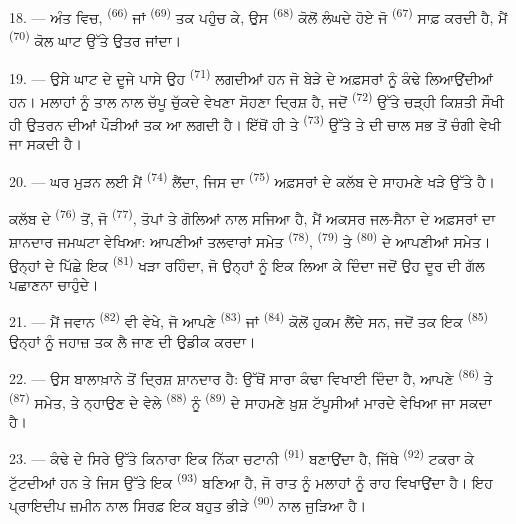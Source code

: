18. --- ਅੰਤ ਵਿਚ,  \textsuperscript{(66)} ਜਾਂ
 \textsuperscript{(69)} ਤਕ ਪਹੁੰਚ ਕੇ, ਉਸ  \textsuperscript{(68)} ਕੋਲੋਂ ਲੰਘਦੇ ਹੋਏ ਜੋ 
\textsuperscript{(67)} ਸਾਫ਼ ਕਰਦੀ ਹੈ, ਮੈਂ 
\textsuperscript{(70)} ਕੋਲ ਘਾਟ ਉੱਤੇ ਉਤਰ ਜਾਂਦਾ।

19. --- ਉਸੇ ਘਾਟ ਦੇ ਦੂਜੇ ਪਾਸੇ ਉਹ  \textsuperscript{(71)}
ਲਗਦੀਆਂ ਹਨ ਜੋ ਬੇੜੇ ਦੇ ਅਫ਼ਸਰਾਂ ਨੂੰ ਕੰਢੇ ਲਿਆਉਂਦੀਆਂ ਹਨ। ਮਲਾਹਾਂ ਨੂੰ ਤਾਲ ਨਾਲ ਚੱਪੂ
ਚੁੱਕਦੇ ਵੇਖਣਾ ਸੋਹਣਾ ਦ੍ਰਿਸ਼ ਹੈ, ਜਦੋਂ  \textsuperscript{(72)} ਉੱਤੇ ਚੜ੍ਹੀ
ਕਿਸ਼ਤੀ ਸੌਖੀ ਹੀ ਉਤਰਨ ਦੀਆਂ ਪੌੜੀਆਂ ਤਕ ਆ ਲਗਦੀ ਹੈ। ਇੱਥੋਂ ਹੀ  ਤੇ
 \textsuperscript{(73)} ਉੱਤੇ  ਤੇ  ਦੀ ਚਾਲ ਸਭ
ਤੋਂ ਚੰਗੀ ਵੇਖੀ ਜਾ ਸਕਦੀ ਹੈ।

\VUsaut{3.0mm}
\VUsaut{3.0mm}

20. --- ਘਰ ਮੁੜਨ ਲਈ ਮੈਂ  \textsuperscript{(74)} ਲੈਂਦਾ, ਜਿਸ ਦਾ
 \textsuperscript{(75)} ਅਫ਼ਸਰਾਂ ਦੇ ਕਲੱਬ ਦੇ ਸਾਹਮਣੇ ਖੜੇ 
ਉੱਤੇ ਹੈ।

ਕਲੱਬ ਦੇ  \textsuperscript{(76)} ਤੋਂ, ਜੋ 
\textsuperscript{(77)}, ਤੋਪਾਂ ਤੇ ਗੋਲਿਆਂ ਨਾਲ ਸਜਿਆ ਹੈ, ਮੈਂ ਅਕਸਰ ਜਲ-ਸੈਨਾ ਦੇ ਅਫ਼ਸਰਾਂ ਦਾ
ਸ਼ਾਨਦਾਰ ਜਮਘਟਾ ਵੇਖਿਆ: ਆਪਣੀਆਂ ਤਲਵਾਰਾਂ ਸਮੇਤ 
\textsuperscript{(78)},  \textsuperscript{(79)} ਤੇ
 \textsuperscript{(80)} ਦੇ  ਆਪਣੀਆਂ 
ਸਮੇਤ। ਉਨ੍ਹਾਂ ਦੇ ਪਿੱਛੇ ਇਕ  \textsuperscript{(81)} ਖੜਾ ਰਹਿੰਦਾ, ਜੋ
ਉਨ੍ਹਾਂ ਨੂੰ ਇਕ  ਲਿਆ ਕੇ ਦਿੰਦਾ ਜਦੋਂ ਉਹ ਦੂਰ ਦੀ ਗੱਲ ਪਛਾਣਨਾ ਚਾਹੁੰਦੇ।

21. --- ਮੈਂ ਜਵਾਨ  \textsuperscript{(82)} ਵੀ ਵੇਖੇ, ਜੋ ਆਪਣੇ
 \textsuperscript{(83)} ਜਾਂ  \textsuperscript{(84)}
ਕੋਲੋਂ ਹੁਕਮ ਲੈਂਦੇ ਸਨ, ਜਦੋਂ ਤਕ ਇਕ  \textsuperscript{(85)}
ਉਨ੍ਹਾਂ ਨੂੰ ਜਹਾਜ਼ ਤਕ ਲੈ ਜਾਣ ਦੀ ਉਡੀਕ ਕਰਦਾ।

22. --- ਉਸ ਬਾਲਾਖ਼ਾਨੇ ਤੋਂ ਦ੍ਰਿਸ਼ ਸ਼ਾਨਦਾਰ ਹੈ: ਉੱਥੋਂ ਸਾਰਾ ਕੰਢਾ ਵਿਖਾਈ ਦਿੰਦਾ ਹੈ, ਆਪਣੇ
 \textsuperscript{(86)} ਤੇ 
\textsuperscript{(87)} ਸਮੇਤ, ਤੇ ਨ੍ਹਾਉਣ ਦੇ ਵੇਲੇ 
\textsuperscript{(88)} ਨੂੰ  \textsuperscript{(89)} ਦੇ ਸਾਹਮਣੇ ਖ਼ੁਸ਼
ਟੱਪੂਸੀਆਂ ਮਾਰਦੇ ਵੇਖਿਆ ਜਾ ਸਕਦਾ ਹੈ।

23. --- ਕੰਢੇ ਦੇ ਸਿਰੇ ਉੱਤੇ ਕਿਨਾਰਾ ਇਕ ਨਿੱਕਾ ਚਟਾਨੀ 
\textsuperscript{(91)} ਬਣਾਉਂਦਾ ਹੈ, ਜਿੱਥੇ  \textsuperscript{(92)}
ਟਕਰਾ ਕੇ ਟੁੱਟਦੀਆਂ ਹਨ ਤੇ ਜਿਸ ਉੱਤੇ ਇਕ 
\textsuperscript{(93)} ਬਣਿਆ ਹੈ, ਜੋ ਰਾਤ ਨੂੰ ਮਲਾਹਾਂ ਨੂੰ ਰਾਹ ਵਿਖਾਉਂਦਾ ਹੈ। ਇਹ ਪ੍ਰਾਇਦੀਪ
ਜ਼ਮੀਨ ਨਾਲ ਸਿਰਫ਼ ਇਕ ਬਹੁਤ ਭੀੜੇ  \textsuperscript{(90)} ਨਾਲ ਜੁੜਿਆ ਹੈ।

